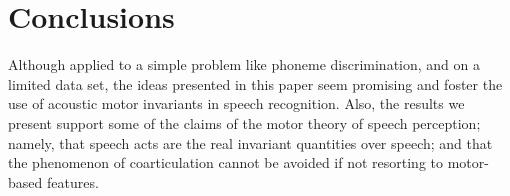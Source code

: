 \section{Conclusions}
\label{sec:concl}

Although applied to a simple problem like phoneme discrimination, and on a
limited data set, the ideas presented in this paper seem promising and foster
the use of acoustic motor invariants in speech recognition. Also,
the results we present support some of the claims of the motor theory
of speech perception; namely, that speech acts are the real invariant
quantities over speech; and that the phenomenon of coarticulation cannot
be avoided if not resorting to motor-based features.




